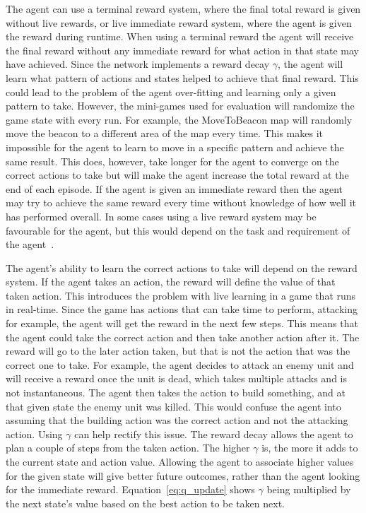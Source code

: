 The agent can use a terminal reward system, where the final total reward is
given without live rewards, or live immediate reward system, where the agent is
given the reward during runtime. When using a terminal reward the agent will
receive the final reward without any immediate reward for what action in that
state may have achieved. Since the network implements a reward decay $\gamma$,
the agent will learn what pattern of actions and states helped to achieve that
final reward. This could lead to the problem of the agent over-fitting and
learning only a given pattern to take. However, the mini-games used for
evaluation will randomize the game state with every run. For example, the
MoveToBeacon map will randomly move the beacon to a different area of the map
every time. This makes it impossible for the agent to learn to move in a
specific pattern and achieve the same result. This does, however, take longer for
the agent to converge on the correct actions to take but will make the agent
increase the total reward at the end of each episode. If the agent is given an
immediate reward then the agent may try to achieve the same reward every time
without knowledge of how well it has performed overall. In some cases using a
live reward system may be favourable for the agent, but this would depend on the
task and requirement of the agent~\cite{shelton2001balancing}.

The agent's ability to learn the correct actions to take will depend on the
reward system. If the agent takes an action, the reward will define the value of
that taken action. This introduces the problem with live learning in a game that
runs in real-time. Since the game has actions that can take time to perform,
attacking for example, the agent will get the reward in the next few steps.
This means that the agent could take the correct action and then take another
action after it. The reward will go to the later action taken, but that is not
the action that was the correct one to take. For example, the agent decides to
attack an enemy unit and will receive a reward once the unit is dead, which
takes multiple attacks and is not instantaneous. The agent then takes the action
to build something, and at that given state the enemy unit was killed. This
would confuse the agent into assuming that the building action was the correct
action and not the attacking action. Using $\gamma$ can help rectify this issue.
The reward decay allows the agent to plan a couple of steps from the taken
action. The higher $\gamma$ is, the more it adds to the current state and action
value. Allowing the agent to associate higher values for the given state will
give better future outcomes, rather than the agent looking for the immediate
reward. Equation~\ref{eq:q_update} shows $\gamma$ being multiplied by the next
state's value based on the best action to be taken next.

